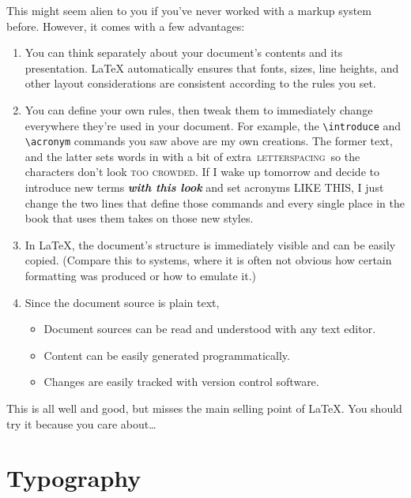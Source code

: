 This might seem alien to you if you've never worked with a markup system before.
However, it comes with a few advantages:
\begin{enumerate}
\item You can think separately about your document's contents and
    its presentation.
    \LaTeX{} automatically ensures that fonts, sizes, line heights,
    and other layout considerations are consistent according to the rules you set.
\item You can define your own rules, then tweak them to immediately change
    everywhere they're used in your document.
    For example, the \verb|\introduce| and \verb|\acronym| commands you saw above
    are my own creations. The former  text, and
    the latter sets words in  with a bit of extra
    \,\textsc{letterspacing}\, so the characters
    don't look \textsc{too crowded}.
    If I wake up tomorrow and decide to introduce new terms
    \textbf{\itshape with this look} and set acronyms
    {\small{} LIKE THIS},
    I just change the two lines that define those commands
    and every single place in the book that uses them takes on those new styles.
\item In \LaTeX, the document's structure is immediately visible
    and can be easily copied.
    (Compare this to  systems, where it is often not obvious
    how certain formatting was produced
    or how to emulate it.)
\item Since the document source is plain text,
    \begin{itemize}
    \item Document sources can be read and understood with any text editor.
    \item Content can be easily generated programmatically.
    \item Changes are easily tracked with version control software.
    \end{itemize}
\end{enumerate}

This is all well and good,
but misses the main selling point of \LaTeX.
You should try it because you care about\ldots

\chapter{Typography}
\label{typography}

